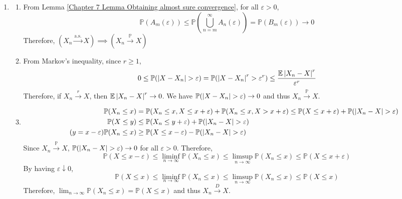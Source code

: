 \documentclass{huhtakm-template-book}
\newcommand{\prob}{\mathbb{P}}
\newcommand{\expect}{\mathbb{E}}
\begin{document}
\begin{proofing}
	\begin{enumerate}
		\item \begin{enumerate}
			\item From Lemma \ref{Chapter 7 Lemma Obtaining almost sure convergence}, for all $\varepsilon>0$,
			\begin{equation*}
				\prob(A_{m}(\varepsilon))\leq\prob\left(\bigcup_{n=m}^{\infty}A_{n}(\varepsilon)\right)=\prob(B_{m}(\varepsilon))\to 0
			\end{equation*}
			Therefore, $(X_{n}\xrightarrow{\text{a.s.}}X)\implies(X_{n}\xrightarrow{\prob}X)$
			\item From Markov's inequality, since $r\geq 1$,
			\begin{equation*}
				0\leq\prob(\abs{X-X_{n}}>\varepsilon)=\prob(\abs{X-X_{n}}^{r}>\varepsilon^{r})\leq\frac{\expect\abs{X_{n}-X}^{r}}{\varepsilon^{r}}
			\end{equation*}
			Therefore, if $X_{n}\xrightarrow{r}X$, then $\expect\abs{X_{n}-X}^{r}\to 0$. We have $\prob(\abs{X-X_{n}}>\varepsilon)\to 0$ and thus $X_{n}\xrightarrow{\prob}X$.
			\item 
			\begin{align*}
				\prob(X_{n}\leq x)&=\prob(X_{n}\leq x,X\leq x+\varepsilon)+\prob(X_{n}\leq x,X>x+\varepsilon)\leq\prob(X\leq x+\varepsilon)+\prob(\abs{X_{n}-X}>\varepsilon)\\
				\prob(X\leq y)&\leq\prob(X_{n}\leq y+\varepsilon)+\prob(\abs{X_{n}-X}>\varepsilon)\\
				\tag{$y=x-\varepsilon$}
				\prob(X_{n}\leq x)
				&\geq\prob(X\leq x-\varepsilon)-\prob(\abs{X_{n}-X}>\varepsilon)
			\end{align*}
			Since $X_{n}\xrightarrow{\prob}X$, $\prob(\abs{X_{n}-X}>\varepsilon)\to 0$ for all $\varepsilon>0$. Therefore,
			\begin{equation*}
				\prob(X\leq x-\varepsilon)\leq\liminf_{n\to\infty}\prob(X_{n}\leq x)\leq\limsup_{n\to\infty}\prob(X_{n}\leq x)\leq\prob(X\leq x+\varepsilon)
			\end{equation*}
			By having $\varepsilon\downarrow 0$,
			\begin{equation*}
				\prob(X\leq x)\leq\liminf_{n\to\infty}\prob(X_{n}\leq x)\leq\limsup_{n\to\infty}\prob(X_{n}\leq x)\leq\prob(X\leq x)
			\end{equation*}
			Therefore, $\lim_{n\to\infty}\prob(X_{n}\leq x)=\prob(X\leq x)$ and thus $X_{n}\xrightarrow{D}X$.
		\end{enumerate}

\end{enumerate}
\end{proofing}
\end{document}
